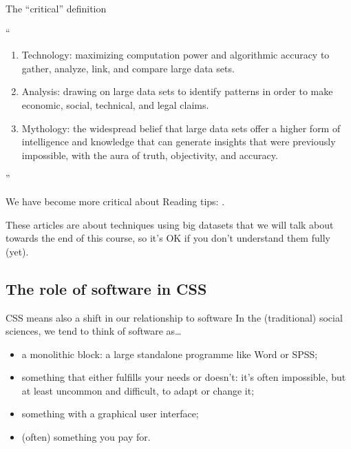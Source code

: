 \begin{frame}{The ``critical'' definition }
	\begin{block}{\textcite{boyd2012}}
		``
		\begin{enumerate}
			\item Technology: maximizing computation power and algorithmic accuracy to gather, analyze, link, and compare large data sets.
			\item Analysis: drawing on large data sets to identify patterns in order to make economic, social, technical, and legal claims.
			\item Mythology: the widespread belief that large data sets offer a higher form of intelligence and knowledge that can generate insights that were previously impossible, with the aura of truth, objectivity, and accuracy.
		\end{enumerate}
		''
	\end{block}
\end{frame}






\begin{frame}{We have become more critical about}
	Reading tips: \textcite{Bender2021, Bolukbasi2016}.
	
	These articles are about techniques using big datasets that we will talk about towards the end of this course, so it's OK if you don't understand them fully (yet).
\end{frame}







\subsection{The role of software in CSS}

\begin{frame}{CSS means also a shift in our relationship to software}
	In the (traditional) social sciences, we tend to think of software as\ldots
\begin{itemize}
	\item a monolithic block: a large standalone programme like Word or SPSS;
	\item something that either fulfills your needs or doesn't: it's often impossible, but at least uncommon and difficult, to adapt or change it;
	\item something with a graphical user interface;
	\item (often) something you pay for.
\end{itemize}
\end{frame}



